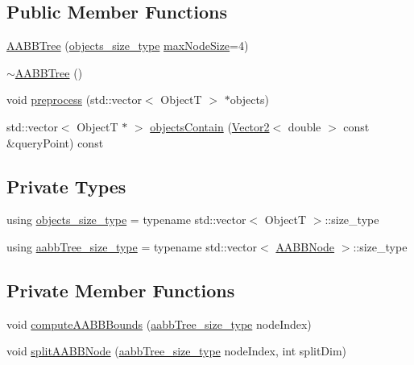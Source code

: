 \subsection*{Public Member Functions}
\begin{DoxyCompactItemize}
\item 
\hyperlink{classfc_1_1AABBTree_a4d8525582030f9cc79b68ed97271c000}{A\+A\+B\+B\+Tree} (\hyperlink{classfc_1_1AABBTree_a3333c421c1fa34841043bd8545de8ea8}{objects\+\_\+size\+\_\+type} \hyperlink{classfc_1_1AABBTree_a4116e801983d055e249fa6166fa47266}{max\+Node\+Size}=4)
\item 
\hyperlink{classfc_1_1AABBTree_a13dfddea7618153509ca07e14334cfe0}{$\sim$\+A\+A\+B\+B\+Tree} ()
\item 
void \hyperlink{classfc_1_1AABBTree_a481a24bdded9dfbebfcb298899126df3}{preprocess} (std\+::vector$<$ ObjectT $>$ $\ast$objects)
\item 
std\+::vector$<$ ObjectT $\ast$ $>$ \hyperlink{classfc_1_1AABBTree_aef6e5c039251417ae18f17cf9f30f638}{objects\+Contain} (\hyperlink{classfc_1_1Vector2}{Vector2}$<$ double $>$ const \&query\+Point) const
\end{DoxyCompactItemize}
\subsection*{Private Types}
\begin{DoxyCompactItemize}
\item 
using \hyperlink{classfc_1_1AABBTree_a3333c421c1fa34841043bd8545de8ea8}{objects\+\_\+size\+\_\+type} = typename std\+::vector$<$ ObjectT $>$\+::size\+\_\+type
\item 
using \hyperlink{classfc_1_1AABBTree_a18706db5b992d8875e08dc325abf3811}{aabb\+Tree\+\_\+size\+\_\+type} = typename std\+::vector$<$ \hyperlink{structfc_1_1AABBTree_1_1AABBNode}{A\+A\+B\+B\+Node} $>$\+::size\+\_\+type
\end{DoxyCompactItemize}
\subsection*{Private Member Functions}
\begin{DoxyCompactItemize}
\item 
void \hyperlink{classfc_1_1AABBTree_aac657a296e6a26e675a259c5d3fef53d}{compute\+A\+A\+B\+B\+Bounds} (\hyperlink{classfc_1_1AABBTree_a18706db5b992d8875e08dc325abf3811}{aabb\+Tree\+\_\+size\+\_\+type} node\+Index)
\item 
void \hyperlink{classfc_1_1AABBTree_a01f4466619083a8820f721cff76831dc}{split\+A\+A\+B\+B\+Node} (\hyperlink{classfc_1_1AABBTree_a18706db5b992d8875e08dc325abf3811}{aabb\+Tree\+\_\+size\+\_\+type} node\+Index, int split\+Dim)
\end{DoxyCompactItemize}
